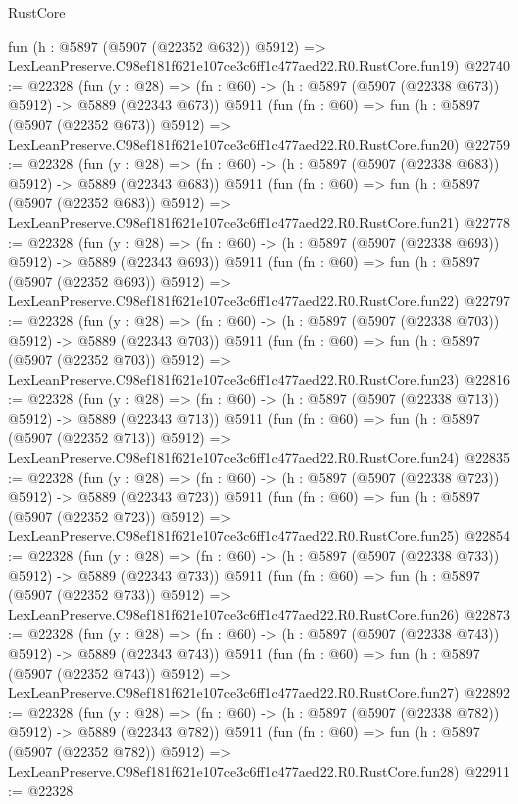 \begin{lexlean}{RustCore}
\begin{coremodule}
    fun (h : @5897 (@5907 (@22352 @632)) @5912) =>
    LexLeanPreserve.C98ef181f621e107ce3c6ff1c477aed22.R0.RustCore.fun19)
@22740 := @22328
    (fun (y : @28) => (fn : @60) -> (h : @5897 (@5907 (@22338 @673)) @5912) -> @5889 (@22343 @673))
    @5911
    (fun (fn : @60) =>
    fun (h : @5897 (@5907 (@22352 @673)) @5912) =>
    LexLeanPreserve.C98ef181f621e107ce3c6ff1c477aed22.R0.RustCore.fun20)
@22759 := @22328
    (fun (y : @28) => (fn : @60) -> (h : @5897 (@5907 (@22338 @683)) @5912) -> @5889 (@22343 @683))
    @5911
    (fun (fn : @60) =>
    fun (h : @5897 (@5907 (@22352 @683)) @5912) =>
    LexLeanPreserve.C98ef181f621e107ce3c6ff1c477aed22.R0.RustCore.fun21)
@22778 := @22328
    (fun (y : @28) => (fn : @60) -> (h : @5897 (@5907 (@22338 @693)) @5912) -> @5889 (@22343 @693))
    @5911
    (fun (fn : @60) =>
    fun (h : @5897 (@5907 (@22352 @693)) @5912) =>
    LexLeanPreserve.C98ef181f621e107ce3c6ff1c477aed22.R0.RustCore.fun22)
@22797 := @22328
    (fun (y : @28) => (fn : @60) -> (h : @5897 (@5907 (@22338 @703)) @5912) -> @5889 (@22343 @703))
    @5911
    (fun (fn : @60) =>
    fun (h : @5897 (@5907 (@22352 @703)) @5912) =>
    LexLeanPreserve.C98ef181f621e107ce3c6ff1c477aed22.R0.RustCore.fun23)
@22816 := @22328
    (fun (y : @28) => (fn : @60) -> (h : @5897 (@5907 (@22338 @713)) @5912) -> @5889 (@22343 @713))
    @5911
    (fun (fn : @60) =>
    fun (h : @5897 (@5907 (@22352 @713)) @5912) =>
    LexLeanPreserve.C98ef181f621e107ce3c6ff1c477aed22.R0.RustCore.fun24)
@22835 := @22328
    (fun (y : @28) => (fn : @60) -> (h : @5897 (@5907 (@22338 @723)) @5912) -> @5889 (@22343 @723))
    @5911
    (fun (fn : @60) =>
    fun (h : @5897 (@5907 (@22352 @723)) @5912) =>
    LexLeanPreserve.C98ef181f621e107ce3c6ff1c477aed22.R0.RustCore.fun25)
@22854 := @22328
    (fun (y : @28) => (fn : @60) -> (h : @5897 (@5907 (@22338 @733)) @5912) -> @5889 (@22343 @733))
    @5911
    (fun (fn : @60) =>
    fun (h : @5897 (@5907 (@22352 @733)) @5912) =>
    LexLeanPreserve.C98ef181f621e107ce3c6ff1c477aed22.R0.RustCore.fun26)
@22873 := @22328
    (fun (y : @28) => (fn : @60) -> (h : @5897 (@5907 (@22338 @743)) @5912) -> @5889 (@22343 @743))
    @5911
    (fun (fn : @60) =>
    fun (h : @5897 (@5907 (@22352 @743)) @5912) =>
    LexLeanPreserve.C98ef181f621e107ce3c6ff1c477aed22.R0.RustCore.fun27)
@22892 := @22328
    (fun (y : @28) => (fn : @60) -> (h : @5897 (@5907 (@22338 @782)) @5912) -> @5889 (@22343 @782))
    @5911
    (fun (fn : @60) =>
    fun (h : @5897 (@5907 (@22352 @782)) @5912) =>
    LexLeanPreserve.C98ef181f621e107ce3c6ff1c477aed22.R0.RustCore.fun28)
@22911 := @22328

\end{coremodule}
\end{lexlean}
